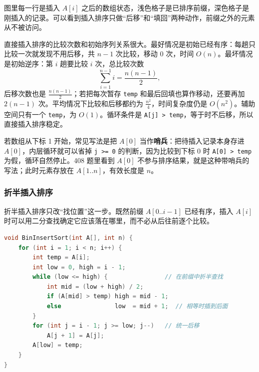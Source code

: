图里每一行是插入 $A[i]$ 之后的数组状态，浅色格子是已排序前缀，深色格子是刚插入的记录。可以看到插入排序只做“后移”和“填回”两种动作，前缀之外的元素从不被访问。

直接插入排序的比较次数和初始序列关系很大。最好情况是初始已经有序：每趟只比较一次就发现不用后移，共 $n-1$ 次比较，移动 0 次，时间 $O(n)$。最坏情况是初始逆序：第 $i$ 趟要比较 $i$ 次，总比较次数
\[
\sum_{i=1}^{n-1} i=\frac{n(n-1)}{2},
\]
后移次数也是 $\frac{n(n-1)}{2}$；若把每次暂存 \texttt{temp} 和最后回填也算作移动，还要再加 $2(n-1)$ 次。平均情况下比较和后移都约为 $\frac{n^2}{4}$，时间复杂度仍是 $O(n^2)$。辅助空间只有一个 \texttt{temp}，为 $O(1)$。循环条件是 \texttt{A[j] > temp}，等于时不后移，所以直接插入排序稳定。

若数组从下标 1 开始，常见写法是把 $A[0]$ 当作\textbf{哨兵}：把待插入记录本身存进 $A[0]$，内层循环就可以省掉 \texttt{j >= 0} 的判断，因为比较到下标 0 时 \texttt{A[0] > temp} 为假，循环自然停止。408 题里看到 $A[0]$ 不参与排序结果，就是这种带哨兵的写法；此时元素存放在 $A[1..n]$，有效长度是 $n$。

\subsubsection{折半插入排序}

折半插入排序只改“找位置”这一步。既然前缀 $A[0..i-1]$ 已经有序，插入 $A[i]$ 时可以用二分查找确定它应该落在哪里，而不必从后往前逐个比较。

\begin{lstlisting}[language=C]
void BinInsertSort(int A[], int n) {
    for (int i = 1; i < n; i++) {
        int temp = A[i];
        int low = 0, high = i - 1;
        while (low <= high) {                // 在前缀中折半查找
            int mid = (low + high) / 2;
            if (A[mid] > temp) high = mid - 1;
            else               low  = mid + 1;  // 相等时插到后面
        }
        for (int j = i - 1; j >= low; j--)   // 统一后移
            A[j + 1] = A[j];
        A[low] = temp;
    }
}
\end{lstlisting}

